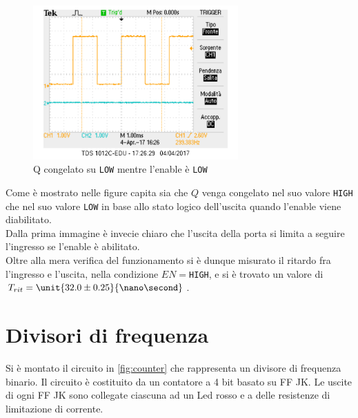 \documentclass[a4paper,10pt]{article}
\def\code#1{\texttt{#1}}
\begin{document}
\begin{figure}[H]
	\centering
	\includegraphics[width=0.7\textwidth]{../grafici/EnableDown1.png}
	\caption{Q congelato su \code{LOW} mentre l'enable è \code{LOW}}
	\label{fig:FFD}
\end{figure}

Come è mostrato nelle figure capita sia che $Q$ venga congelato nel suo valore \code{HIGH} che nel suo valore \code{LOW} in base allo stato logico dell'uscita quando l'enable viene diabilitato.\\
Dalla prima immagine è invecie chiaro che l'uscita della porta si limita a seguire l'ingresso se l'enable è abilitato.\\
Oltre alla mera verifica del funzionamento si è dunque misurato il ritardo fra l'ingresso e l'uscita, nella condizione $EN=$\code{HIGH}, e si è trovato un valore di $T_{rit}=\unit{32.0\pm 0.25 }{\nano\second}$.





\section{Divisori di frequenza}
Si è montato il circuito in \cref{fig:counter} che rappresenta un divisore di frequenza binario.
Il circuito è costituito da un contatore a 4 bit basato su FF JK. Le uscite di ogni FF JK sono collegate
ciascuna ad un Led rosso e a delle resistenze di limitazione di corrente.
\end{document}
